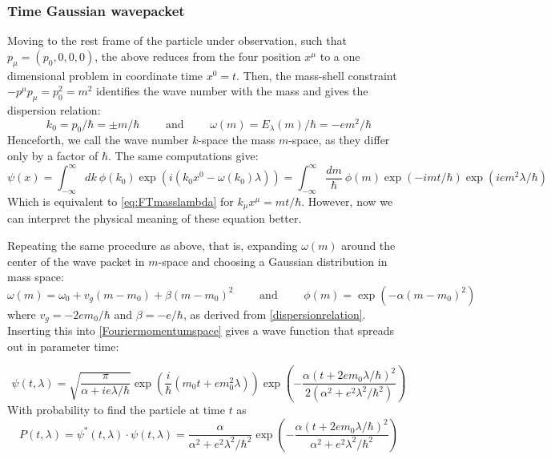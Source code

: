 \documentclass[a4paper,10pt]{article}
\numberwithin{equation}{section}
\begin{document}
\subsubsection{Time Gaussian wavepacket}
Moving to the rest frame of the particle under observation, such that $p_\mu = (p_0, 0, 0, 0)$, the above reduces from the four position $x^\mu$ to a one dimensional problem in coordinate time $x^0 = t$. Then, the mass-shell constraint $- p^\mu p_\mu = p_0^2 = m^2$ identifies the wave number with the mass and gives the dispersion relation:
\begin{equation}
    k_0 = p_0/\hbar = \pm m /\hbar \qquad \text{ and } \qquad \omega(m) = E_\lambda (m) /\hbar = -em^2/\hbar
    \label{dispersionrelation}
\end{equation}
Henceforth, we call the wave number $k$-space the mass $m$-space, as they differ only by a factor of $\hbar$. The same computations give:
\begin{equation}
    \psi(x) = \int_{-\infty}^{\infty} dk \ \phi(k_0)  \exp{\left(i (k_0 x^0 - \omega(k_0) \lambda) \right)} = \int_{-\infty}^{\infty} \frac{dm}{\hbar} \ \phi(m)  \exp{\left(-i m t/\hbar \right)} \exp{\left( i em^2 \lambda/\hbar \right)}
    \label{Fouriermomentumspace}
\end{equation}
Which is equivalent to \ref{eq:FTmasslambda} for $k_\mu x^\mu = mt/\hbar$. However, now we can interpret the physical meaning of these equation better.

Repeating the same procedure as above, that is, expanding $\omega(m)$ around the center of the wave packet in $m$-space and choosing a Gaussian distribution in mass space:
\begin{equation}
    \omega(m) = \omega_0 + v_g (m - m_0) + \beta (m - m_0)^2 \qquad \text{ and } \qquad  \phi(m) = \exp{\left( - \alpha (m - m_0)^2 \right)}
\end{equation}
where $v_g = -2 e m_0/\hbar$ and $\beta = - e/\hbar$, as derived from \ref{dispersionrelation}. Inserting this into \ref{Fouriermomentumspace} gives a wave function that spreads out in parameter time:

\begin{equation}
    \psi ( t, \lambda) = \sqrt{\frac{\pi}{\alpha + i e \lambda/\hbar}} \exp{\left(\frac{i}{\hbar} (m_0 t + e m_0^2 \lambda) \right)} \exp{\left(-\frac{ \alpha ( t +2 e m_0\lambda/\hbar )^2}{2( \alpha^2 + e^2 \lambda^2/\hbar^2)}\right)}
\end{equation}
With probability to find the particle at time $t$ as
\begin{equation}
    P(t,\lambda) = \psi^* ( t, \lambda) \cdot \psi ( t, \lambda) = \frac{ \alpha}{ \alpha^2 + e^2 \lambda^2/\hbar^2} \exp{\left(-\frac{ \alpha ( t +2 e m_0\lambda/\hbar )^2}{ \alpha^2 + e^2 \lambda^2/\hbar^2}\right)}
\end{equation}
\end{document}
